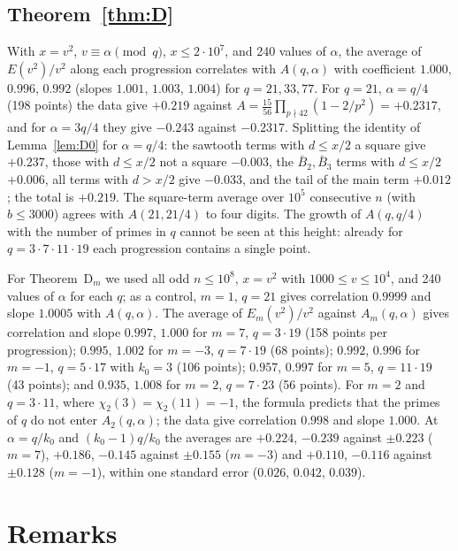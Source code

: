 \documentclass[11pt]{amsart}
\theoremstyle{remark}
\begin{document}
\subsection*{Theorem~\ref{thm:D}}
With $x=v^2$, $v\equiv\alpha\pmod q$, $x\le2\cdot10^7$, and 240 values of $\alpha$, the average of $E(v^2)/v^2$ along each progression correlates with $A(q,\alpha)$ with coefficient $1.000$, $0.996$, $0.992$ (slopes $1.001$, $1.003$, $1.004$) for $q=21,33,77$. For $q=21$, $\alpha=q/4$ (198 points) the data give $+0.219$ against $A=\frac{15}{56}\prod_{p\nmid42}(1-2/p^2)=+0.2317$, and for $\alpha=3q/4$ they give $-0.243$ against $-0.2317$. Splitting the identity of Lemma~\ref{lem:D0} for $\alpha=q/4$: the sawtooth terms with $d\le x/2$ a square give $+0.237$, those with $d\le x/2$ not a square $-0.003$, the $\bar B_2,\bar B_3$ terms with $d\le x/2$ $+0.006$, all terms with $d>x/2$ give $-0.033$, and the tail of the main term $+0.012$; the total is $+0.219$. The square-term average over $10^5$ consecutive $n$ (with $b\le3000$) agrees with $A(21,21/4)$ to four digits. The growth of $A(q,q/4)$ with the number of primes in $q$ cannot be seen at this height: already for $q=3\cdot7\cdot11\cdot19$ each progression contains a single point.

For Theorem~D$_m$ we used all odd $n\le10^8$, $x=v^2$ with $1000\le v\le10^4$, and 240 values of $\alpha$ for each $q$; as a control, $m=1$, $q=21$ gives correlation $0.9999$ and slope $1.0005$ with $A(q,\alpha)$. The average of $E_m(v^2)/v^2$ against $A_m(q,\alpha)$ gives correlation and slope $0.997$, $1.000$ for $m=7$, $q=3\cdot19$ (158 points per progression); $0.995$, $1.002$ for $m=-3$, $q=7\cdot19$ (68 points); $0.992$, $0.996$ for $m=-1$, $q=5\cdot17$ with $k_0=3$ (106 points); $0.957$, $0.997$ for $m=5$, $q=11\cdot19$ (43 points); and $0.935$, $1.008$ for $m=2$, $q=7\cdot23$ (56 points). For $m=2$ and $q=3\cdot11$, where $\chi_2(3)=\chi_2(11)=-1$, the formula predicts that the primes of $q$ do not enter $A_2(q,\alpha)$; the data give correlation $0.998$ and slope $1.000$. At $\alpha=q/k_0$ and $(k_0-1)q/k_0$ the averages are $+0.224$, $-0.239$ against $\pm0.223$ ($m=7$), $+0.186$, $-0.145$ against $\pm0.155$ ($m=-3$) and $+0.110$, $-0.116$ against $\pm0.128$ ($m=-1$), within one standard error ($0.026$, $0.042$, $0.039$).

\section{Remarks}\label{sec:remarks}
\end{document}
